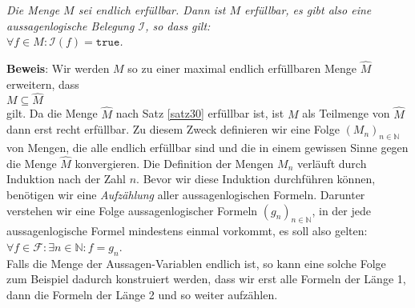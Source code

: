 \begin{Satz}
{\em
  Die Menge $M$ sei endlich erf\"{u}llbar.  Dann ist $M$ erf\"{u}llbar, es gibt also eine aussagenlogische
  Belegung $\mathcal{I}$, so dass gilt:
  \\[0.2cm]
  \hspace*{1.3cm}
  $\forall f \in M: \mathcal{I}(f) = \mathtt{true}$.
} 
\end{Satz}

\noindent
\textbf{Beweis}:  Wir werden $M$ so zu einer maximal endlich erf\"{u}llbaren Menge $\widehat{M}$
erweitern, dass 
\\[0.2cm]
\hspace*{1.3cm}
$M \subseteq \widehat{M}$
\\[0.2cm]
gilt.  Da die Menge $\widehat{M}$ nach Satz \ref{satz30} erf\"{u}llbar ist, ist $M$ als Teilmenge von
$\widehat{M}$ dann erst recht erf\"{u}llbar.
Zu diesem Zweck definieren wir eine Folge $(M_n)_{n\in \mathbb{N}}$ von Mengen, die alle endlich
erf\"{u}llbar sind und die in einem gewissen Sinne gegen die Menge $\widehat{M}$ konvergieren.
Die Definition der Mengen $M_n$ verl\"{a}uft durch Induktion nach der Zahl $n$.  Bevor wir diese
Induktion durchf\"{u}hren k\"{o}nnen, ben\"{o}tigen wir eine \emph{Aufz\"{a}hlung} aller aussagenlogischen Formeln.
Darunter verstehen wir eine Folge aussagenlogischer Formeln $(g_n)_{n \in \mathbb{N}}$, in der jede
aussagenlogische Formel mindestens einmal vorkommt, es soll also gelten:
\\[0.2cm]
\hspace*{1.3cm}
$\forall f \in \mathcal{F}: \exists n \in \mathbb{N}: f = g_n$.
\\[0.2cm]
Falls die Menge der Aussagen-Variablen endlich ist, so kann eine solche Folge zum Beispiel dadurch konstruiert
werden, dass wir erst alle Formeln der L\"{a}nge 1, dann die Formeln der L\"{a}nge 2 und so weiter
aufz\"{a}hlen.  

